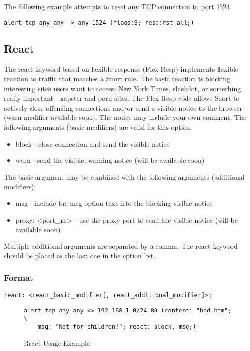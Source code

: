 \documentclass[english]{report}
\begin{document}
The following example attempts to reset any TCP connection to port 1524.
\begin{verbatim}
alert tcp any any -> any 1524 (flags:S; resp:rst_all;)
\end{verbatim}


\subsection{React}

The react keyword based on flexible response (Flex Resp) implements flexible
reaction to traffic that matches a Snort rule. The basic reaction is blocking
interesting sites users want to access: New York Times, slashdot, or something
really important - napster and porn sites. The Flex Resp code allows Snort to
actively close offending connections and/or send a visible notice to the
browser (warn modifier available soon). The notice may include your own
comment. The following arguments (basic modifiers) are valid for this option:

\begin{itemize}
\item block - close connection and send the visible notice 
\item warn - send the visible, warning notice (will be available soon) 
\end{itemize}
The basic argument may be combined with the following arguments (additional
modifiers): 

\begin{itemize}
\item msg - include the msg option text into the blocking visible notice 
\item proxy: <port\_nr> - use the proxy port to send the visible notice
(will be available soon)
\end{itemize}
Multiple additional arguments are separated by a comma. The react
keyword should be placed as the last one in the option list.


\subsubsection{Format}

\begin{verbatim}
react: <react_basic_modifier[, react_additional_modifier]>;
\end{verbatim}
%
\begin{figure}[!hbpt]
\begin{verbatim}
alert tcp any any <> 192.168.1.0/24 80 (content: "bad.htm"; \
    msg: "Not for children!"; react: block, msg;) 
\end{verbatim}
\caption{\label{react examples}React Usage Example}
\end{figure}
\end{document}
